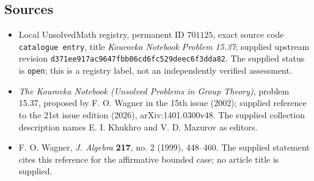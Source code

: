 \documentclass[11pt]{article}
\begin{document}
\subsection{Sources}
\begin{itemize}
\item Local UnsolvedMath registry, permanent ID \(701125\), exact source code \texttt{catalogue entry}, title \emph{Kourovka Notebook Problem 15.37}; supplied upstream revision \texttt{d371ee917ac9647fbb06cd6fc529deec6f3dda82}. The supplied status is \texttt{open}; this is a registry label, not an independently verified assessment.
\item \emph{The Kourovka Notebook (Unsolved Problems in Group Theory)}, problem 15.37, proposed by F. O. Wagner in the 15th issue (2002); supplied reference to the 21st issue edition (2026), arXiv:1401.0300v48. The supplied collection description names E. I. Khukhro and V. D. Mazurov as editors.
\item F. O. Wagner, \emph{J. Algebra} \textbf{217}, no. 2 (1999), 448--460. The supplied statement cites this reference for the affirmative bounded case; no article title is supplied.
\end{itemize}
\end{document}
